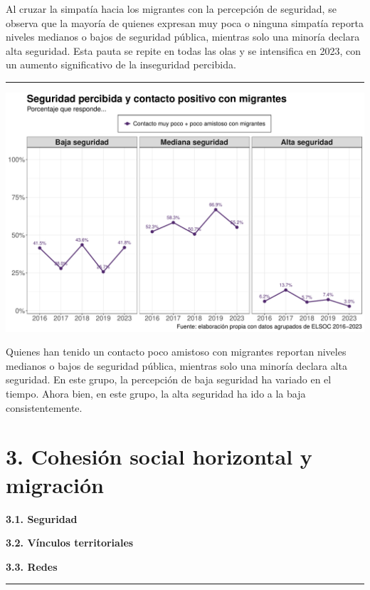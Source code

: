 \documentclass[
  spanish,
  letterpaper,
  DIV=11,
  numbers=noendperiod,
  oneside]{scrartcl}
\begin{document}
Al cruzar la simpatía hacia los migrantes con la percepción de
seguridad, se observa que la mayoría de quienes expresan muy poca o
ninguna simpatía reporta niveles medianos o bajos de seguridad pública,
mientras solo una minoría declara alta seguridad. Esta pauta se repite
en todas las olas y se intensifica en 2023, con un aumento significativo
de la inseguridad percibida.

\begin{center}\rule{0.5\linewidth}{0.5pt}\end{center}

\begin{center}
\includegraphics[width=1\linewidth,height=\textheight,keepaspectratio]{cep_2025_files/figure-pdf/unnamed-chunk-6-1.pdf}
\end{center}

Quienes han tenido un contacto poco amistoso con migrantes reportan
niveles medianos o bajos de seguridad pública, mientras solo una minoría
declara alta seguridad. En este grupo, la percepción de baja seguridad
ha variado en el tiempo. Ahora bien, en este grupo, la alta seguridad ha
ido a la baja consistentemente.

\section{3. Cohesión social horizontal y
migración}\label{cohesiuxf3n-social-horizontal-y-migraciuxf3n-2}

{\textbf{3.1. Seguridad}}

{\textbf{3.2. Vínculos territoriales}}

{\textbf{3.3. Redes}}

\begin{center}\rule{0.5\linewidth}{0.5pt}\end{center}
\end{document}
